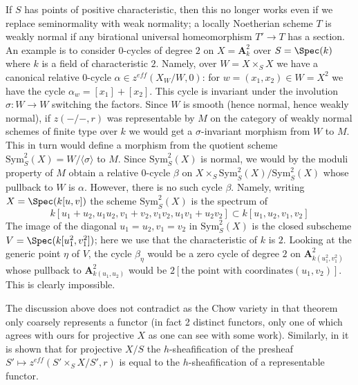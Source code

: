 \begin{remark}[Representable]
\medskip\noindent
If $S$ has points of positive characteristic, then this no longer works
even if we replace seminormality with weak normality; a locally Noetherian
scheme $T$ is weakly normal if any birational universal homeomorphism
$T' \to T$ has a section. An example is to consider $0$-cycles of degree
$2$ on $X = \mathbf{A}^2_k$ over $S = \Spec(k)$ where $k$ is a field of
characteristic $2$. Namely, over $W = X \times_S X$ we have a canonical
relative $0$-cycle $\alpha \in z^{eff}(X_W/W, 0)$: for
$w = (x_1, x_2) \in W = X^2$ we have the cycle $\alpha_w = [x_1] + [x_2]$.
This cycle is invariant under the involution $\sigma : W \to W$ switching
the factors. Since $W$ is smooth (hence normal, hence weakly normal), if
$z(-/-, r)$ was representable by $M$ on the category of weakly normal
schemes of finite type over $k$ we would get a $\sigma$-invariant
morphism from $W$ to $M$. This in turn would define a morphism from the
quotient scheme $\text{Sym}^2_S(X) = W/\langle \sigma \rangle$ to $M$.
Since $\text{Sym}^2_S(X)$ is normal, we would by the moduli property of $M$
obtain a relative $0$-cycle $\beta$ on
$X \times_S \text{Sym}^2_S(X) / \text{Sym}^2_S(X)$
whose pullback to $W$ is $\alpha$. However, there is no such cycle $\beta$.
Namely, writing $X = \Spec(k[u, v])$ the scheme
$\text{Sym}^2_S(X)$ is the spectrum of
$$
k[u_1 + u_2, u_1u_2, v_1 + v_2, v_1v_2, u_1v_1 + u_2v_2]
\subset
k[u_1, u_2, v_1, v_2]
$$
The image of the diagonal $u_1 = u_2, v_1 = v_2$ in $\text{Sym}^2_S(X)$
is the closed subscheme $V = \Spec(k[u_1^2, v_1^2])$; here we use that
the characteristic of $k$ is $2$. Looking at the
generic point $\eta$ of $V$, the cycle $\beta_\eta$ would be a zero
cycle of degree $2$ on $\mathbf{A}^2_{k(u_1^2, v_1^2)}$
whose pullback to $\mathbf{A}^2_{k(u_1, u_2)}$ would be
$2[\text{the point with coordinates} (u_1, v_2)]$.
This is clearly impossible.

\medskip\noindent
The discussion above does not contradict \cite[Theorem 4.13]{KRC} as the Chow
variety in that theorem only coarsely represents a functor (in fact 2
distinct functors, only one of which agrees with ours for projective $X$
as one can see with some work). Similarly, in \cite[Section 4.4]{SV}
it is shown that for projective $X/S$ the $h$-sheafification of the presheaf
$S' \mapsto z^{eff}(S' \times_S X/S', r)$ is equal to the $h$-sheafification of
a representable functor.
\end{remark}

